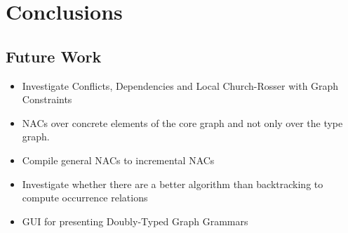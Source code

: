 \chapter{Conclusions}

\section{Future Work}

\begin{itemize}
  \item Investigate Conflicts, Dependencies and Local Church-Rosser with Graph Constraints
  \item NACs over concrete elements of the core graph and not only over the type graph. 
  \item Compile general NACs to incremental NACs
  \item Investigate whether there are a better algorithm than backtracking to compute occurrence relations
  \item GUI for presenting Doubly-Typed Graph Grammars
\end{itemize}
